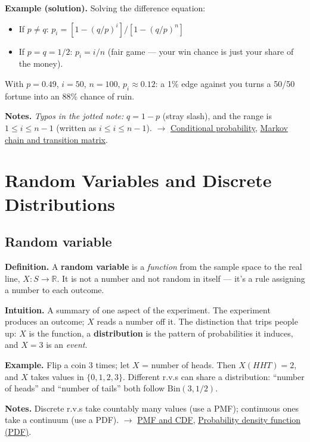 \documentclass[11pt,a4paper]{article}
\begin{document}
\textbf{Example (solution).} Solving the difference equation:
\begin{itemize}[leftmargin=1.4em]
\item If $p \neq  q$: $p_{i} = [1 - (q/p)^{i}] / [1 - (q/p)^{n}]$
\item If $p = q = 1/2$: $p_{i} = i/n$ (fair game --- your win chance is just your share of the money).
\end{itemize}

With $p = 0.49$, $i = 50$, $n = 100$, $p_{i} \approx  0.12$: a 1\% edge against you turns a 50/50 fortune into an 88\% chance of ruin.

\textbf{Notes.} \textit{Typos in the jotted note:} $q = 1 - p$ (stray slash), and the range is $1 \leq  i \leq  n-1$ (written as $i \leq  i \leq  n-1$). $\to$ \hyperref[sec:conditional-probability]{Conditional probability}, \hyperref[sec:markov-chain-and-transition-matrix]{Markov chain and transition matrix}.


\section{Random Variables and Discrete Distributions}

\subsection{Random variable}\label{sec:random-variable}

\textbf{Definition.} A \textbf{random variable} is a \textit{function} from the sample space to the real line, $X : S \to  \mathbb{R}$. It is not a number and not random in itself --- it's a rule assigning a number to each outcome.

\textbf{Intuition.} A summary of one aspect of the experiment. The experiment produces an outcome; $X$ reads a number off it. The distinction that trips people up: $X$ is the function, a \textbf{distribution} is the pattern of probabilities it induces, and $X = 3$ is an \textit{event}.

\textbf{Example.} Flip a coin 3 times; let $X$ = number of heads. Then $X(HHT) = 2$, and $X$ takes values in $\{0,1,2,3\}$. Different r.v.s can share a distribution: ``number of heads'' and ``number of tails'' both follow $\mathrm{Bin}(3, 1/2)$.

\textbf{Notes.} Discrete r.v.s take countably many values (use a PMF); continuous ones take a continuum (use a PDF). $\to$ \hyperref[sec:pmf-and-cdf]{PMF and CDF}, \hyperref[sec:probability-density-function-pdf]{Probability density function (PDF)}.
\end{document}
